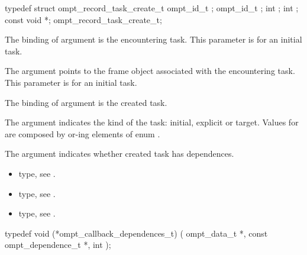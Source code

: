 \record

\begin{ccppspecific}
\begin{omptRecord}
typedef struct ompt_record_task_create_t {
  ompt_id_t ;
  ompt_id_t ;
  int ;
  int ;
  const void *;
} ompt_record_task_create_t;
\end{omptRecord}
\end{ccppspecific}


\argdesc

The binding of argument  is the
encountering task.
This parameter is  for an initial task.

The argument  points to the frame object
associated with the encountering task.
This parameter is  for an initial task.

The binding of argument  is the created
task.

The argument  indicates the kind of the task: initial,
explicit or target.
Values for  are composed by or-ing elements of enum
.

The argument  indicates whether created
task has dependences.

\codeptrdesc

\crossreferences
\begin{itemize}
\item {} type, see
.
\item {} type, see
.
\item {} type, see
.
\end{itemize}



\label{sec:ompt_callback_dependences_t}
\format

\begin{ccppspecific}
\begin{omptCallback}
typedef void (*ompt_callback_dependences_t) (
  ompt_data_t *,
  const ompt_dependence_t *,
  int 
);
\end{omptCallback}
\end{ccppspecific}


